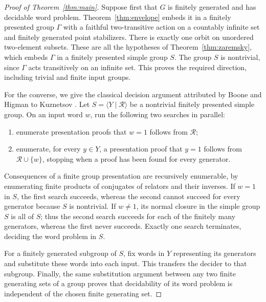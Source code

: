 \begin{proof}[Proof of Theorem~\ref{thm:main}]
Suppose first that $G$ is finitely generated and has decidable word
problem.  Theorem~\ref{thm:envelope} embeds it in a finitely presented
group $\Gamma$ with a faithful two-transitive action on a countably
infinite set and finitely generated point stabilizers.  There is exactly one orbit on unordered
two-element subsets.  These are all the hypotheses of
Theorem~\ref{thm:zaremsky}, which embeds $\Gamma$ in a finitely
presented simple group $S$.  The group $S$ is nontrivial, since
$\Gamma$ acts transitively on an infinite set.  This proves the
required direction, including trivial and finite input groups.

For the converse, we give the classical decision argument attributed
by Boone and Higman to Kuznetsov \cite[p.~52]{BH74}.
Let $S=\langle Y\mid\mathcal R\rangle$ be a nontrivial
finitely presented simple group.  On an input word $w$, run the
following two searches in parallel:
\begin{enumerate}[label=(\roman*)]
 \item enumerate presentation proofs that $w=1$ follows from
       $\mathcal R$;
 \item enumerate, for every $y\in Y$, a presentation proof that
       $y=1$ follows from $\mathcal R\cup\{w\}$, stopping when
       a proof has been found for every generator.
\end{enumerate}
Consequences of a finite group presentation are recursively enumerable,
by enumerating finite products of conjugates of relators and their
inverses.  If $w=1$ in $S$, the first search succeeds, whereas the
second cannot succeed for every generator because $S$ is nontrivial.
If $w\ne1$, its normal closure in the simple group $S$ is all of $S$;
thus the second search succeeds for each of the finitely many
generators, whereas the first never succeeds.  Exactly one search
terminates, deciding the word problem in $S$.

For a finitely generated subgroup of $S$, fix words in $Y$ representing
its generators and substitute these words into each input.  This
transfers the decider to that subgroup.  Finally, the same substitution
argument between any two finite generating sets of a group proves
that decidability of its word problem is independent of the chosen
finite generating set.
\end{proof}
